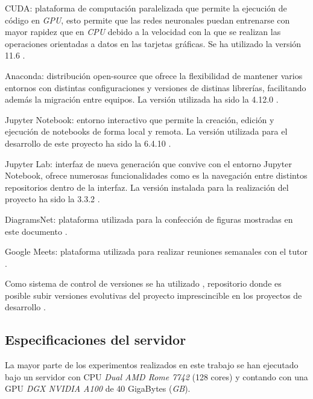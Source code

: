            \begin{description}

                \item CUDA: plataforma de computación paralelizada que permite la ejecución de código en \textit{GPU}, esto permite que las redes neuronales puedan entrenarse con mayor rapidez que en \textit{CPU} debido a la velocidad con la que se realizan las operaciones orientadas a datos en las tarjetas gráficas. Se ha utilizado la versión 11.6 \cite{CUDA}.

                \item Anaconda: distribución open-source que ofrece la flexibilidad de mantener varios entornos con distintas configuraciones y versiones de distinas librerías, facilitando además la migración entre equipos. La versión utilizada ha sido la 4.12.0 \cite{Anaconda}.

                \item Jupyter Notebook: entorno interactivo que permite la creación, edición y ejecución de notebooks de forma local y remota. La versión utilizada para el desarrollo de este proyecto ha sido la 6.4.10 \cite{JupyterNotebook}.

                \item Jupyter Lab: interfaz de nueva generación que convive con el entorno Jupyter Notebook, ofrece numerosas funcionalidades como es la navegación entre distintos repositorios dentro de la interfaz. La versión instalada para la realización del proyecto ha sido la 3.3.2 \cite{JupyterLab}.

                \item DiagramsNet: plataforma utilizada para la confección de figuras mostradas en este documento \cite{DiagramsNet}. 

                \item Google Meets: plataforma utilizada para realizar reuniones semanales con el tutor \cite{GoogleMeet}.

            \end{description}

            Como sistema de control de versiones se ha utilizado \cite{Github}, repositorio donde es posible subir versiones evolutivas del proyecto imprescincible en los proyectos de desarrollo \cite{Software}.

        \subsection{Especificaciones del servidor}
            La mayor parte de los experimentos realizados en este trabajo se han ejecutado bajo un servidor con CPU \textit{Dual AMD Rome 7742} (128 cores) y contando con una GPU \textit{DGX NVIDIA A100} de  40 GigaBytes (\textit{GB}).
            